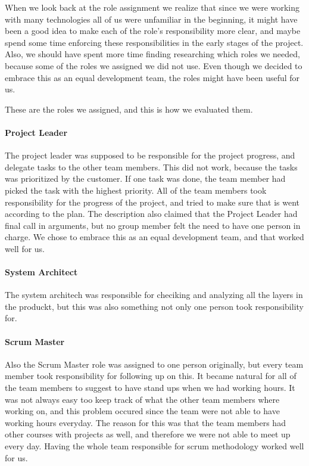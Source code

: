 When we look back at the role assignment we realize that since we were working with many technologies all of us were unfamiliar in the beginning, it might have been a good idea to make each of the role's responsibility more clear, and maybe spend some time enforcing these responsibilities in the early stages of the project. Also, we should have spent more time finding researching which roles we needed, because some of the roles we assigned we did not use. Even though we decided to embrace this as an equal development team, the roles might have been useful for us. 

These are the roles we assigned, and this is how we evaluated them.

\paragraph{Project Leader}
The project leader was supposed to be responsible for the project progress, and delegate tasks to the other team members. This did not work, because the tasks was prioritized by the customer. If one task was done, the team member had picked the task with the highest priority. All of the team members took responsibility for the progress of the project, and tried to make sure that is went according to the plan. The description also claimed that the Project Leader had final call in arguments, but no group member felt the need to have one person in charge. We chose to embrace this as an equal development team, and that worked well for us.

\paragraph{System Architect}
The system architech was responsible for checiking and analyzing all the layers in the produckt, but this was also something not only one person took responsibility for. 

\paragraph{Scrum Master}
Also the Scrum Master role was assigned to one person originally, but every team member took responsibility for following up on this. It became natural for all of the team members to suggest to have stand ups when we had working hours. It was not always easy too keep track of what the other team members where working on, and this problem occured since the team were not able to have working hours everyday. The reason for this was that the team members had other courses with projects as well, and therefore we were not able to meet up every day. Having the whole team responsible for scrum methodology worked well for us.

